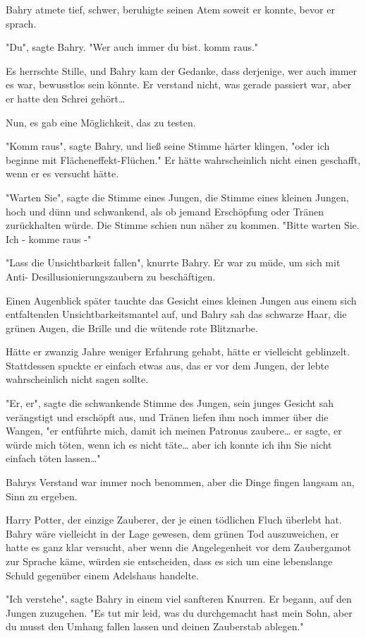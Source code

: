 {Bahry atmete tief, schwer, beruhigte seinen Atem soweit er konnte, bevor er sprach.

"Du", sagte Bahry. "Wer auch immer du bist. komm raus."

Es herrschte Stille, und Bahry kam der Gedanke, dass derjenige, wer auch immer es war, bewusstlos sein könnte. Er verstand nicht, was gerade passiert war, aber er hatte den Schrei gehört…

Nun, es gab eine Möglichkeit, das zu testen.

"Komm raus", sagte Bahry, und ließ seine Stimme härter klingen, "oder ich beginne mit Flächeneffekt-Flüchen." Er hätte wahrscheinlich nicht einen geschafft, wenn er es versucht hätte.

"Warten Sie", sagte die Stimme eines Jungen, die Stimme eines kleinen Jungen, hoch und dünn und schwankend, als ob jemand Erschöpfung oder Tränen zurückhalten würde. Die Stimme schien nun näher zu kommen. "Bitte warten Sie. Ich - komme raus -"

"Lass die Unsichtbarkeit fallen", knurrte Bahry. Er war zu müde, um sich mit Anti- Desillusionierungszaubern zu beschäftigen.

Einen Augenblick später tauchte das Gesicht eines kleinen Jungen aus einem sich entfaltenden Unsichtbarkeitsmantel auf, und Bahry sah das schwarze Haar, die grünen Augen, die Brille und die wütende rote Blitznarbe.

Hätte er zwanzig Jahre weniger Erfahrung gehabt, hätte er vielleicht geblinzelt. Stattdessen spuckte er einfach etwas aus, das er vor dem Jungen, der lebte wahrscheinlich nicht sagen sollte.

"Er, er", sagte die schwankende Stimme des Jungen, sein junges Gesicht sah verängstigt und erschöpft aus, und Tränen liefen ihm noch immer über die Wangen, "er entführte mich, damit ich meinen Patronus zaubere… er sagte, er würde mich töten, wenn ich es nicht täte… aber ich konnte ich ihn Sie nicht einfach töten lassen…"

Bahrys Verstand war immer noch benommen, aber die Dinge fingen langsam an, Sinn zu ergeben.

Harry Potter, der einzige Zauberer, der je einen tödlichen Fluch überlebt hat. Bahry wäre vielleicht in der Lage gewesen, dem grünen Tod auszuweichen, er hatte es ganz klar versucht, aber wenn die Angelegenheit vor dem Zaubergamot zur Sprache käme, würden sie entscheiden, dass es sich um eine lebenslange Schuld gegenüber einem Adelshaus handelte.

"Ich verstehe", sagte Bahry in einem viel sanfteren Knurren. Er begann, auf den Jungen zuzugehen. "Es tut mir leid, was du durchgemacht hast mein Sohn, aber du musst den Umhang fallen lassen und deinen Zauberstab ablegen."

}
